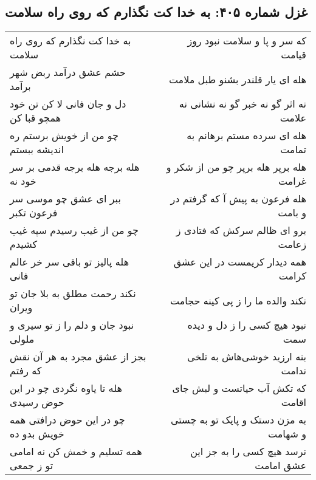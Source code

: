 \begin{center}
\section*{غزل شماره ۴۰۵: به خدا کت نگذارم که روی راه سلامت}
\label{sec:0405}
\begin{longtable}{l p{0.5cm} r}
به خدا کت نگذارم که روی راه سلامت
&&
که سر و پا و سلامت نبود روز قیامت
\\
حشم عشق درآمد ربض شهر برآمد
&&
هله ای یار قلندر بشنو طبل ملامت
\\
دل و جان فانی لا کن تن خود همچو قبا کن
&&
نه اثر گو نه خبر گو نه نشانی نه علامت
\\
چو من از خویش برستم ره اندیشه ببستم
&&
هله ای سرده مستم برهانم به تمامت
\\
هله برجه هله برجه قدمی بر سر خود نه
&&
هله برپر هله برپر چو من از شکر و غرامت
\\
ببر ای عشق چو موسی سر فرعون تکبر
&&
هله فرعون به پیش آ که گرفتم در و بامت
\\
چو من از غیب رسیدم سپه غیب کشیدم
&&
برو ای ظالم سرکش که فتادی ز زعامت
\\
هله پالیز تو باقی سر خر عالم فانی
&&
همه دیدار کریمست در این عشق کرامت
\\
نکند رحمت مطلق به بلا جان تو ویران
&&
نکند والده ما را ز پی کینه حجامت
\\
نبود جان و دلم را ز تو سیری و ملولی
&&
نبود هیچ کسی را ز دل و دیده سمت
\\
بجز از عشق مجرد به هر آن نقش که رفتم
&&
بنه ارزید خوشی‌هاش به تلخی ندامت
\\
هله تا یاوه نگردی چو در این حوض رسیدی
&&
که تکش آب حیاتست و لبش جای اقامت
\\
چو در این حوض درافتی همه خویش بدو ده
&&
به مزن دستک و پایک تو به چستی و شهامت
\\
همه تسلیم و خمش کن نه امامی تو ز جمعی
&&
نرسد هیچ کسی را به جز این عشق امامت
\\
\end{longtable}
\end{center}
